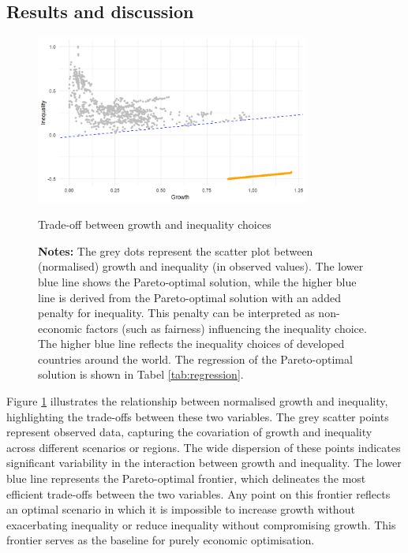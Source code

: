 \documentclass[12pt]{article}
\begin{document}
\subsection{Results and discussion}
\begin{figure}[H]
    \centering
    \includegraphics[width=0.8\textwidth]{trade_off.png}
    \caption{Trade-off between growth and inequality choices}
    \captionsetup{font=footnotesize}
    \caption*{\textbf{Notes:} The grey dots represent the scatter plot between (normalised) growth and inequality (in observed values). The lower blue line shows the Pareto-optimal solution, while the higher blue line is derived from the Pareto-optimal solution with an added penalty for inequality. This penalty can be interpreted as non-economic factors (such as fairness) influencing the inequality choice. The higher blue line reflects the inequality choices of developed countries around the world. The regression of the Pareto-optimal solution is shown in Tabel \ref{tab:regression}.}
    \label{fig:trade_off}
\end{figure}

Figure \ref{fig:trade_off} illustrates the relationship between normalised growth and inequality, highlighting the trade-offs between these two variables. The grey scatter points represent observed data, capturing the covariation of growth and inequality across different scenarios or regions. The wide dispersion of these points indicates significant variability in the interaction between growth and inequality. The lower blue line represents the Pareto-optimal frontier, which delineates the most efficient trade-offs between the two variables. Any point on this frontier reflects an optimal scenario in which it is impossible to increase growth without exacerbating inequality or reduce inequality without compromising growth. This frontier serves as the baseline for purely economic optimisation.
\end{document}
